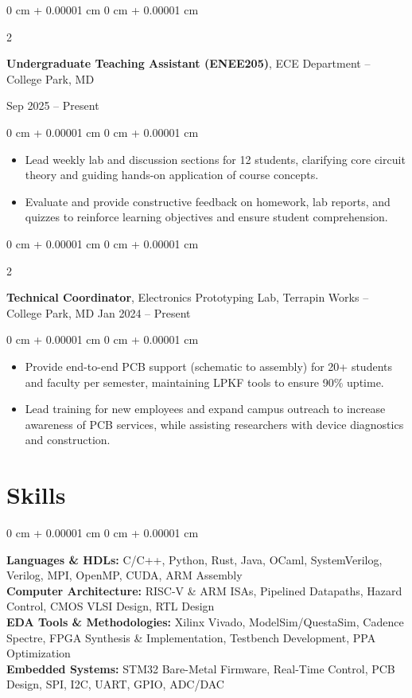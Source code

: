 \documentclass[10pt, letterpaper]{article}
\newenvironment{highlights}{
    \begin{itemize}[
        topsep=0.05 cm,
        parsep=0.05 cm,
        partopsep=0pt,
        itemsep=0pt,
        leftmargin=0 cm + 10pt
    ]
}{
    \end{itemize}
}
\newenvironment{onecolentry}{
    \begin{adjustwidth}{
        0 cm + 0.00001 cm
    }{
        0 cm + 0.00001 cm
    }
}{
    \end{adjustwidth}
}
\newenvironment{twocolentry}[2][]{
    \onecolentry
    \def\secondColumn{#2}
    \setcolumnwidth{\fill, 4.5 cm}
    \begin{paracol}{2}
}{
    \switchcolumn \raggedleft \secondColumn
    \end{paracol}
    \endonecolentry
}
\begin{document}
        \vspace{0.15 cm}
        
        \begin{twocolentry}{
            Sep 2025 – Present
        }
            \textbf{Undergraduate Teaching Assistant (ENEE205)}, ECE Department -- College Park, MD
        \end{twocolentry}
        \vspace{0.05 cm}
        \begin{onecolentry}
            \begin{highlights}
                \item Lead weekly lab and discussion sections for 12 students, clarifying core circuit theory and guiding hands-on application of course concepts.
                \item Evaluate and provide constructive feedback on homework, lab reports, and quizzes to reinforce learning objectives and ensure student comprehension.
            \end{highlights}
        \end{onecolentry}
        
        \vspace{0.15 cm}

        \begin{twocolentry}{
            Jan 2024 – Present
        }
            \textbf{Technical Coordinator}, Electronics Prototyping Lab, Terrapin Works -- College Park, MD \end{twocolentry}
        \vspace{0.05 cm}
        \begin{onecolentry}
            \begin{highlights}
                \item Provide end-to-end PCB support (schematic to assembly) for 20+ students and faculty per semester, maintaining LPKF tools to ensure 90\% uptime.
                \item Lead training for new employees and expand campus outreach to increase awareness of PCB services, while assisting researchers with device diagnostics and construction.
            \end{highlights}
        \end{onecolentry}
    \section{Skills}
        \begin{onecolentry}
            \textbf{Languages \& HDLs:} C/C++, Python, Rust, Java, OCaml, SystemVerilog, Verilog, MPI, OpenMP, CUDA, ARM Assembly \\
            \textbf{Computer Architecture:} RISC-V \& ARM ISAs, Pipelined Datapaths, Hazard Control, CMOS VLSI Design, RTL Design \\
            \textbf{EDA Tools \& Methodologies:} Xilinx Vivado, ModelSim/QuestaSim, Cadence Spectre, FPGA Synthesis \& Implementation, Testbench Development, PPA Optimization \\
            \textbf{Embedded Systems:} STM32 Bare-Metal Firmware, Real-Time Control, PCB Design, SPI, I2C, UART, GPIO, ADC/DAC
        \end{onecolentry}
\end{document}
